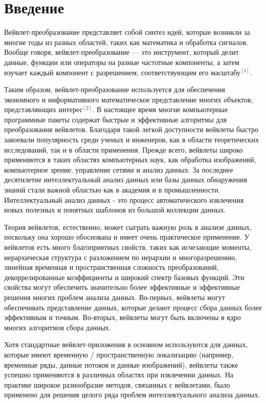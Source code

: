 \documentclass[a4paper]{article}
\newcommand{\anonsection}[1]{ \section*{#1} \addcontentsline{toc}{section}{\numberline {}#1}}
\begin{document}
	\newpage
	
	\fancyfoot[C]{\thepage}
	
	
	\tableofcontents
	\newpage
	
	
	\anonsection{Введение}
	
	Вейвлет-преобразование представляет собой синтез идей, которые возникли за многие годы из разных областей, таких как математика и обработка сигналов. Вообще говоря, вейвлет-преобразование --- это инструмент, который делит данные, функции или операторы на разные частотные компоненты, а затем изучает каждый компонент с разрешением, соответствующим его масштабу$^{[1]}$.
	
	Таким образом, вейвлет-преобразование используется для обеспечения экономного и информативного математическое представление многих объектов, представляющих интерес$^{[2]}$. В настоящее время многие компьютерные программные пакеты содержат быстрые и эффективные алгоритмы для преобразования вейвлетов. Благодаря такой легкой доступности вейвлеты быстро завоевали популярность среди ученых и инженеров, как в области теоретических исследований, так и в области применения. Прежде всего, вейвлеты широко применяются в таких областях компьютерных наук, как обработка изображений, компьютерное зрение, управление сетями и анализ данных. За последнее десятилетие интеллектуальный анализ данных или базы данных обнаружения знаний стали важной областью как в академия и в промышленности. Интеллектуальный анализ данных - это процесс автоматического извлечения новых полезных и понятных шаблонов из большой коллекции данных.
	
	Теория вейвлетов, естественно, может сыграть важную роль в анализе данных, поскольку она хорошо обоснована и имеет очень практическое применение. У вейвлетов есть много благоприятных свойств, таких как исчезающие моменты, иерархическая структура с разложением по иерархии и многоразрешению, линейная временная и пространственная сложность преобразований, декоррелированные коэффициенты и широкий спектр базовых функций. Эти свойства могут обеспечить значительно более эффективные и эффективные решения многих проблем анализа данных. Во-первых, вейвлеты могут обеспечивать представление данных, которые делают процесс сбора данных более эффективным и точным. Во-вторых, вейвлеты могут быть включены в ядро многих алгоритмов сбора данных.
	
	Хотя стандартные вейвлет-приложения в основном используются для данных, которые имеют временную / пространственную локализацию (например, временные ряды, данные потоков и данные изображений), вейвлеты также успешно применяются в различных областях при извлечении данных. На практике широкое разнообразие методов, связанных с вейвлетами, было применено для решения целого ряда проблем интеллектуального анализа данных.
	
\end{document}
